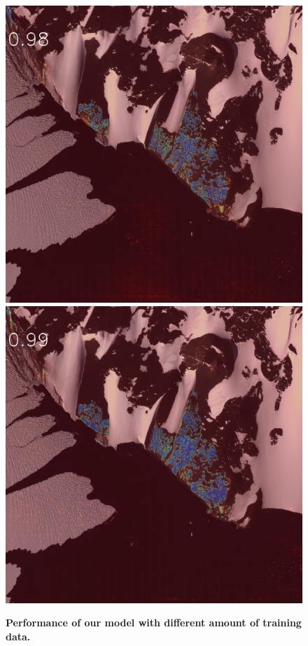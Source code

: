 \documentclass[runningheads]{llncs}
\begin{document}
\begin{figure}[h]
\includegraphics[width=\subFigx]{./fig/datagrow/MSE_single_unet_train_0_3.txt_bias-1_bs128_do0.1e25/WV02_20110131195115_1030010009CCF900_11JAN31195115-M1BS-052549143040_01_P003_u08rf3031.png}
\includegraphics[width=\subFigx]{./fig/datagrow/MSE_single_unet_train_0_4.txt_bias-1_bs128_do0.1e25/WV02_20110131195115_1030010009CCF900_11JAN31195115-M1BS-052549143040_01_P003_u08rf3031.png}
\caption{{{\bf Performance of our model with different amount of training data.}}}
\label{fig:impress}
\end{figure}
\end{document}
